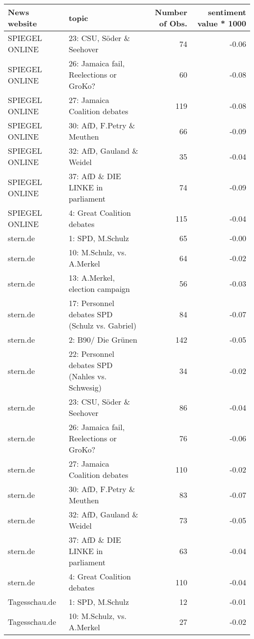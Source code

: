\begin{table}[ht]
\centering
\begin{tabular}{llrr}
  \hline
News website & topic & Number of Obs. & sentiment value * 1000 \\ 
  \hline
SPIEGEL ONLINE & 23: CSU, Söder \& Seehover &  74 & -0.06 \\ 
  SPIEGEL ONLINE & 26: Jamaica fail, Reelections or GroKo? &  60 & -0.08 \\ 
  SPIEGEL ONLINE & 27: Jamaica Coalition debates & 119 & -0.08 \\ 
  SPIEGEL ONLINE & 30: AfD, F.Petry \& Meuthen &  66 & -0.09 \\ 
  SPIEGEL ONLINE & 32: AfD, Gauland \& Weidel &  35 & -0.04 \\ 
  SPIEGEL ONLINE & 37: AfD \& DIE LINKE in parliament &  74 & -0.09 \\ 
  SPIEGEL ONLINE & 4: Great Coalition debates & 115 & -0.04 \\ 
  stern.de & 1: SPD, M.Schulz &  65 & -0.00 \\ 
  stern.de & 10: M.Schulz, vs. A.Merkel &  64 & -0.02 \\ 
  stern.de & 13: A.Merkel, election campaign &  56 & -0.03 \\ 
  stern.de & 17: Personnel debates SPD (Schulz vs. Gabriel) &  84 & -0.07 \\ 
  stern.de & 2: B90/ Die Grünen & 142 & -0.05 \\ 
  stern.de & 22: Personnel debates SPD (Nahles vs. Schwesig) &  34 & -0.02 \\ 
  stern.de & 23: CSU, Söder \& Seehover &  86 & -0.04 \\ 
  stern.de & 26: Jamaica fail, Reelections or GroKo? &  76 & -0.06 \\ 
  stern.de & 27: Jamaica Coalition debates & 110 & -0.02 \\ 
  stern.de & 30: AfD, F.Petry \& Meuthen &  83 & -0.07 \\ 
  stern.de & 32: AfD, Gauland \& Weidel &  73 & -0.05 \\ 
  stern.de & 37: AfD \& DIE LINKE in parliament &  63 & -0.04 \\ 
  stern.de & 4: Great Coalition debates & 110 & -0.04 \\ 
  Tagesschau.de & 1: SPD, M.Schulz &  12 & -0.01 \\ 
  Tagesschau.de & 10: M.Schulz, vs. A.Merkel &  27 & -0.02 \\ 

\end{tabular}
\end{table}
